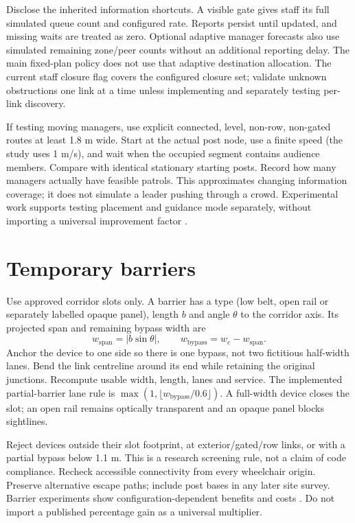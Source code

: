 \documentclass[11pt,a4paper]{article}
\begin{document}
Disclose the inherited information shortcuts. A visible gate gives staff its full simulated queue count and configured rate. Reports persist until updated, and missing waits are treated as zero. Optional adaptive manager forecasts also use simulated remaining zone/peer counts without an additional reporting delay. The main fixed-plan policy does not use that adaptive destination allocation. The current staff closure flag covers the configured closure set; validate unknown obstructions one link at a time unless implementing and separately testing per-link discovery.

If testing moving managers, use explicit connected, level, non-row, non-gated routes at least 1.8 m wide. Start at the actual post node, use a finite speed (the study uses 1 m/s), and wait when the occupied segment contains audience members. Compare with identical stationary starting posts. Record how many managers actually have feasible patrols. This approximates changing information coverage; it does not simulate a leader pushing through a crowd. Experimental work supports testing placement and guidance mode separately, without importing a universal improvement factor \cite{liu}.

\section{Temporary barriers}

Use approved corridor slots only. A barrier has a type (low belt, open rail or separately labelled opaque panel), length $b$ and angle $\theta$ to the corridor axis. Its projected span and remaining bypass width are
\begin{equation}\label{impl:eq19}
 w_{\mathrm{span}}=|b\sin\theta|,\qquad
 w_{\mathrm{bypass}}=w_e-w_{\mathrm{span}}.
\end{equation}
Anchor the device to one side so there is one bypass, not two fictitious half-width lanes. Bend the link centreline around its end while retaining the original junctions. Recompute usable width, length, lanes and service. The implemented partial-barrier lane rule is $\max(1,\lfloor w_{\mathrm{bypass}}/0.6\rfloor)$. A full-width device closes the slot; an open rail remains optically transparent and an opaque panel blocks sightlines.

Reject devices outside their slot footprint, at exterior/gated/row links, or with a partial bypass below 1.1 m. This is a research screening rule, not a claim of code compliance. Recheck accessible connectivity from every wheelchair origin. Preserve alternative escape paths; include post bases in any later site survey. Barrier experiments show configuration-dependent benefits and costs \cite{wang,feliciani,chen}. Do not import a published percentage gain as a universal multiplier.
\end{document}
